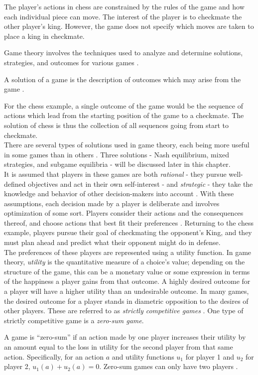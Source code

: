 The player's actions in chess are constrained by the rules of the game and how each individual piece can move. The interest of the player is to checkmate the other player's king. However, the game does not specify which moves are taken to place a king in checkmate.

Game theory involves the techniques used to analyze and determine solutions, strategies, and outcomes for various games \cite{osbo94}.
\begin{define}
  A solution of a game is the description of outcomes which may arise from the game \cite{osbo94}.
\end{define}

For the chess example, a single outcome of the game would be the sequence of actions which lead from the starting position of the game to a checkmate. The solution of chess is thus the collection of all sequences going from start to checkmate.\\

There are several types of solutions used in game theory, each being more useful in some games than in others \cite{osbo94}. Three solutions - Nash equilibrium, mixed strategies, and subgame equilibria - will be discussed later in this chapter.\\

It is assumed that players in these games are both \textit{rational} - they pursue well-defined objectives and act in their own self-interest - and \textit{strategic} - they take the knowledge and behavior of other decision-makers into account \cite{osbo94}. With these assumptions, each decision made by a player is deliberate and involves optimization of some sort. Players consider their actions and the consequences thereof, and choose actions that best fit their preferences \cite{osbo94}. Returning to the chess example, players pursue their goal of checkmating the opponent's King, and they must plan ahead and predict what their opponent might do in defense.\\

The preferences of these players are represented using a utility function. In game theory, \textit{utility} is the quantitative measure of a choice's value; depending on the structure of the game, this can be a monetary value or some expression in terms of the happiness a player gains from that outcome. A highly desired outcome for a player will have a higher utility than an undesirable outcome. In many games, the desired outcome for a player stands in diametric opposition to the desires of other players. These are referred to as \textit{strictly competitive games} \cite{osbo94}. One type of strictly competitive game is a \textit{zero-sum game}.
\begin{define}
  A game is ``zero-sum'' if an action made by one player increases their utility by an amount equal to the loss in utility for the second player from that same action. Specifically, for an action $a$ and utility functions $u_1$ for player 1 and $u_2$ for player 2, $u_1(a)+u_2(a)=0$. Zero-sum games can only have two players \cite{shoh09}.
\end{define}

